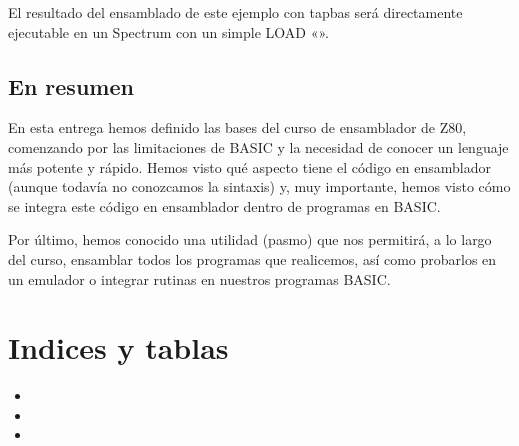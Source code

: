 \documentclass[letterpaper,10pt,spanish]{sphinxmanual}
\begin{document}
El resultado del ensamblado de este ejemplo con \textendash{}tapbas será directamente ejecutable en un Spectrum con un simple LOAD «».


\section{En resumen}
\label{\detokenize{02_introduccion/introduccion:en-resumen}}
En esta entrega hemos definido las bases del curso de ensamblador de Z80, comenzando por las limitaciones de BASIC y la necesidad de conocer un lenguaje más potente y rápido. Hemos visto qué aspecto tiene el código en ensamblador (aunque todavía no conozcamos la sintaxis) y, muy importante, hemos visto cómo se integra este código en ensamblador dentro de programas en BASIC.

Por último, hemos conocido una utilidad (pasmo) que nos permitirá, a lo largo del curso, ensamblar todos los programas que realicemos, así como probarlos en un emulador o integrar rutinas en nuestros programas BASIC.


\chapter{Indices y tablas}
\label{\detokenize{index:indices-y-tablas}}\begin{itemize}
\item {} 

\item {} 

\item {} 

\end{itemize}



\renewcommand{\indexname}{Índice}
\printindex
\end{document}
